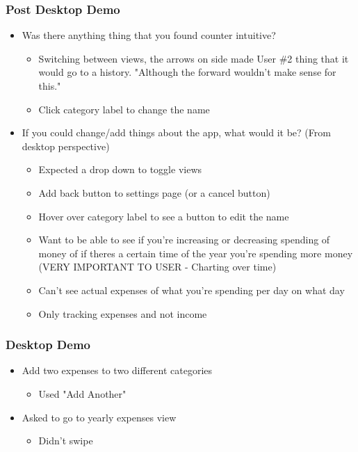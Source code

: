 \documentclass{chi2011}
\begin{document}
	\subsubsection{Post Desktop Demo}
	\begin{itemize}[noitemsep]
		\item Was there anything thing that you found counter intuitive?
		\begin{itemize}[noitemsep]
			\item Switching between views, the arrows on side made User \#2 thing that it would go to a 
			history. "Although the forward wouldn't make sense for this."
			\item Click category label to change the name
		\end{itemize}
		\item If you could change/add things about the app, what would it be? (From desktop perspective)
		\begin{itemize}[noitemsep]
			\item Expected a drop down to toggle views
			\item Add back button to settings page (or a cancel button)
			\item Hover over category label to see a button to edit the name
			\item Want to be able to see if you're increasing or decreasing spending of money of if theres a 
			  certain time of the year you're spending more money (VERY IMPORTANT TO USER - Charting
			  over time)
			\item Can't see actual expenses of what you're spending per day on what day
			\item Only tracking expenses and not income
		\end{itemize}
	\end{itemize}
	
	
	\subsubsection{Desktop Demo}
	\begin{itemize}[noitemsep] 
		\item Add two expenses to two different categories
		\begin{itemize}[noitemsep]
			\item Used "Add Another"
		\end{itemize}
	\item Asked to go to yearly expenses view
		\begin{itemize}[noitemsep]
			\item Didn't swipe
		\end{itemize}
	\end{itemize}
\end{document}
